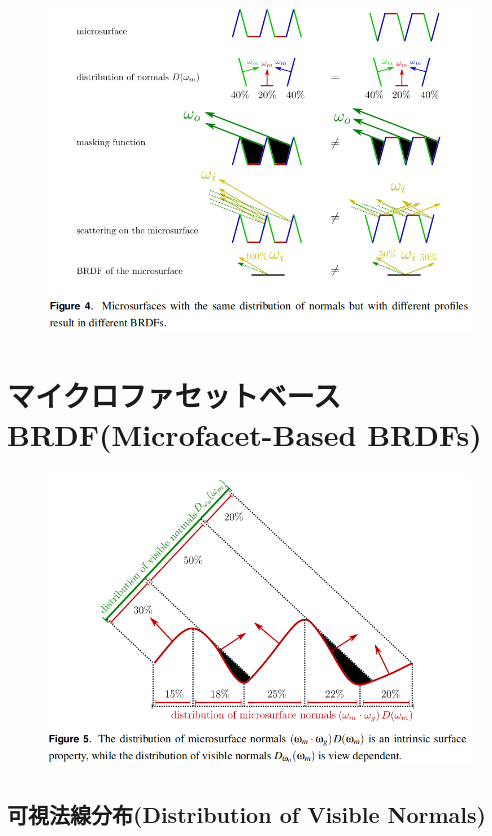 \documentclass[a4j,xelatex,ja=standard]{bxjsarticle}
\begin{document}
\begin{figure}
    \includegraphics[width=\textwidth]{Figure4.png}
    \caption{}
    \label{fig:4}
\end{figure}

\section{マイクロファセットベースBRDF(Microfacet-Based BRDFs)}

\begin{figure}
    \includegraphics[width=\textwidth]{Figure5.png}
    \caption{}
    \label{fig:5}
\end{figure}

\subsection{可視法線分布(Distribution of Visible Normals)}
\end{document}
